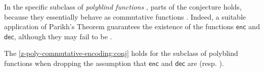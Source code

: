 In the specific subclass of \emph{polyblind functions}
\cite{LENP21,DOUE22}, parts of the conjecture holds,
because they essentially behave as commutative functions \cite[Theorem
6.12]{DOUE23}. Indeed, a suitable application of Parikh's Theorem
\cite{PARI66} guarantees the existence of the functions $\mathsf{enc}$
and $\mathsf{dec}$, although they may fail to be  .

\begin{lemma}
    \label{z-poly-commutative-encoding:remark}
    The \cref{z-poly-commutative-encoding:conj} holds for the
    subclass of polyblind functions when dropping the assumption that
    $\mathsf{enc}$ and $\mathsf{dec}$ are 
    (resp. ).
\end{lemma}
